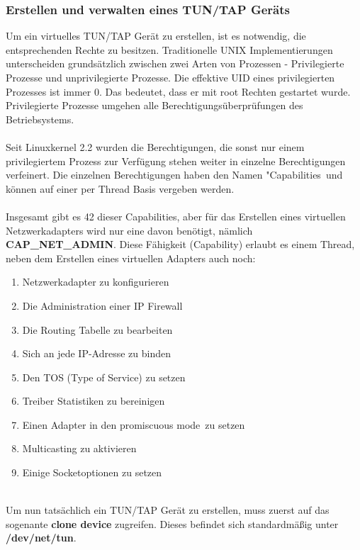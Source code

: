 \subsubsection{Erstellen und verwalten eines TUN/TAP Geräts}
Um ein virtuelles TUN/TAP Gerät zu erstellen, ist es notwendig, die entsprechenden Rechte zu besitzen. Traditionelle UNIX Implementierungen unterscheiden grundsätzlich zwischen zwei Arten von Prozessen -  Privilegierte Prozesse und unprivilegierte Prozesse. Die effektive UID eines privilegierten Prozesses ist immer 0. Das bedeutet, dass er mit root Rechten gestartet wurde. Privilegierte Prozesse umgehen alle Berechtigungsüberprüfungen des Betriebsystems. 
\\\\
Seit Linuxkernel 2.2 wurden die Berechtigungen, die sonst nur einem privilegiertem Prozess zur Verfügung stehen weiter in einzelne Berechtigungen verfeinert. Die einzelnen Berechtigungen haben den Namen "Capabilities\dq \ und können auf einer per Thread Basis vergeben werden.
\\\\
Insgesamt gibt es 42 dieser Capabilities, aber für das Erstellen eines virtuellen Netzwerkadapters wird nur eine davon benötigt, nämlich \textbf{CAP\_NET\_ADMIN}. Diese Fähigkeit (Capability) erlaubt es einem Thread, neben dem Erstellen eines virtuellen Adapters auch noch:
\\
\begin{enumerate}
    \item Netzwerkadapter zu konfigurieren
    \item Die Administration einer IP Firewall
    \item Die Routing Tabelle zu bearbeiten
    \item Sich an jede IP-Adresse zu binden
    \item Den TOS (Type of Service) zu setzen 
    \item Treiber Statistiken zu bereinigen
    \item Einen Adapter in den \dq promiscuous mode\dq \ zu setzen
    \item Multicasting zu aktivieren
    \item Einige Socketoptionen zu setzen
\end{enumerate} 
\ \\
Um nun tatsächlich ein TUN/TAP Gerät zu erstellen, muss zuerst auf das sogenante \textbf{clone device} zugreifen. Dieses befindet sich standardmäßig unter \textbf{/dev/net/tun}.
